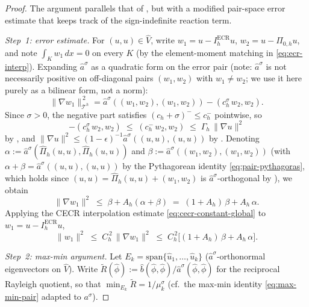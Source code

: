 \documentclass[11pt]{article}
\theoremstyle{plain}
\theoremstyle{definition}
\theoremstyle{remark}
\newcommand{\dx}{\,dx}
\newcommand{\ECR}{\mathrm{ECR}}
\begin{document}
\begin{proof}
The argument parallels that of , but
with a modified pair-space error estimate that keeps track of the
sign-indefinite reaction term.

\emph{Step~1: error estimate.}
For $(u,u)\in\widehat V$, write $w_1=u-I_h^{\ECR}u$,
$w_2=u-\Pi_{0,h}u$, and note $\int_K w_1\dx=0$ on every $K$
(by the element-moment matching in \eqref{eq:ecr-interp}).
Expanding $\widehat a^\sigma$ as a quadratic form on the error pair
(note: $\widehat a^\sigma$ is not necessarily positive on off-diagonal
pairs $(w_1,w_2)$ with $w_1\ne w_2$; we use it here purely as a
bilinear form, not a norm):
\begin{equation}
\label{eq:ew-grad-split}
  \|\nabla w_1\|_{\mathcal{T}^h}^{\,2}
  = \widehat a^\sigma((w_1,w_2),(w_1,w_2))
    - (c_h^\sigma\,w_2,w_2).
\end{equation}
Since $\sigma>0$, the negative part satisfies
$(c_h+\sigma)^-\le c_h^-$ pointwise, so
\begin{equation}
	\label{eq:est-using-gamma-h}
  -(c_h^\sigma\,w_2,w_2)
  \;\le\; (c_h^-\,w_2,w_2)
  \;\le\; \Gamma_h\,\|\nabla u\|^2
\end{equation}
by , and
$\|\nabla u\|^2\le(1{-}\epsilon)^{-1}\widehat a^\sigma((u,u),(u,u))$
by .  Denoting
$\alpha:=\widehat a^\sigma(\widehat\Pi_h(u,u),\widehat\Pi_h(u,u))$ and
$\beta:=\widehat a^\sigma((w_1,w_2),(w_1,w_2))$
(with $\alpha+\beta=\widehat a^\sigma((u,u),(u,u))$ by the
Pythagorean identity \eqref{eq:pair-pythagoras},
which holds since $(u,u)=\widehat\Pi_h(u,u)+(w_1,w_2)$ is
$\widehat a^\sigma$-orthogonal by ), we obtain
\begin{equation}
\label{eq:ew-grad-bound}
  \|\nabla w_1\|^2
  \;\le\; \beta + A_h(\alpha+\beta)
  \;=\; (1{+}A_h)\,\beta + A_h\,\alpha.
\end{equation}
Applying the CECR interpolation estimate
\eqref{eq:cecr-constant-global} to
$w_1=u-I_h^{\ECR}u$,
\begin{equation}
\label{eq:ew-w1-bound}
  \|w_1\|^2
  \;\le\; C_h^{\,2}\,\|\nabla w_1\|^2
  \;\le\; C_h^{\,2}\bigl[(1{+}A_h)\,\beta + A_h\,\alpha\bigr].
\end{equation}

\emph{Step~2: max-min argument.}
Let $E_k=\mathrm{span}\{\widehat u_1,\ldots,\widehat u_k\}$
($\widehat a^\sigma$-orthonormal eigenvectors on $\widehat V$).
Write $\widetilde R(\widehat\phi):=
\widehat b(\widehat\phi,\widehat\phi)/\widehat a^\sigma(\widehat\phi,\widehat\phi)$
for the reciprocal Rayleigh quotient, so that
$\min_{E_k}\widetilde R = 1/\mu_k^\sigma$
(cf.\ the max-min identity \eqref{eq:max-min-pair} adapted to $a^\sigma$).


\end{proof}
\end{document}
